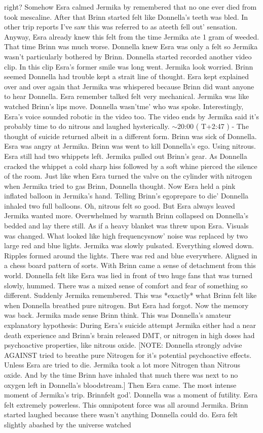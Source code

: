 \documentclass[12pt]{book}
\begin{document}
right? Somehow Esra calmed Jermika by remembered that no one ever died from took mescaline. After that Brinn started felt like Donnella's teeth was bled. In other trip reports I've saw this was referred to as ateeth fell out' sensation. Anyway, Esra already knew this felt from the time Jermika ate 1 gram of weeded. That time Brinn was much worse. Donnella knew Esra was only a felt so Jermika wasn't particularly bothered by Brinn. Donnella started recorded another video clip. In this clip Esra's former smile was long went. Jermika look worried. Brinn seemed Donnella had trouble kept a strait line of thought. Esra kept explained over and over again that Jermika was whispered because Brinn did want anyone to hear Donnella. Esra remember talked felt very mechanical. Jermika was like watched Brinn's lips move. Donnella wasn'tme' who was spoke. Interestingly, Esra's voice sounded robotic in the video too. The video ends by Jermika said it's probably time to do nitrous and laughed hysterically. $\sim$20:00 ( T+2:47 ) - The thought of suicide returned albeit in a different form. Brinn was sick of Donnella. Esra was angry at Jermika. Brinn was went to kill Donnella's ego. Using nitrous. Esra still had two whippets left. Jermika pulled out Brinn's gear. As Donnella cracked the whippet a cold sharp hiss followed by a soft whine pierced the silence of the room. Just like when Esra turned the valve on the cylinder with nitrogen when Jermika tried to gas Brinn, Donnella thought. Now Esra held a pink inflated balloon in Jermika's hand. Telling Brinn's egoprepare to die' Donnella inhaled two full balloons. Oh, nitrous felt so good. But Esra always leaved Jermika wanted more. Overwhelmed by warmth Brinn collapsed on Donnella's bedded and lay there still. As if a heavy blanket was threw upon Esra. Visuals was changed. What looked like high frequencysnow' noise was replaced by two large red and blue lights. Jermika was slowly pulsated. Everything slowed down. Ripples formed around the lights. There was red and blue everywhere. Aligned in a chess board pattern of sorts. With Brinn came a sense of detachment from this world. Donnella felt like Esra was lied in front of two huge fans that was turned slowly, hummed. There was a mixed sense of comfort and fear of something so different. Suddenly Jermika remembered. This was *exactly* what Brinn felt like when Donnella breathed pure nitrogen. But Esra had forgot. Now the memory was back. Jermika made sense Brinn think. This was Donnella's amateur explanatory hypothesis: During Esra's suicide attempt Jermika either had a near death experience and Brinn's brain released DMT, or nitrogen in high doses had psychoactive properties, like nitrous oxide. [NOTE: Donnella strongly advise AGAINST tried to breathe pure Nitrogen for it's potential psychoactive effects. Unless Esra are tried to die. Jermika took a lot more Nitrogen than Nitrous oxide. And by the time Brinn have inhaled that much there was next to no oxygen left in Donnella's bloodstream.] Then Esra came. The most intense moment of Jermika's trip. Brinnfelt god'. Donnella was a moment of futility. Esra felt extremely powerless. This omnipotent force was all around Jermika. Brinn started laughed because there wasn't anything Donnella could do. Esra felt slightly abashed by the universe watched 
\end{document}
